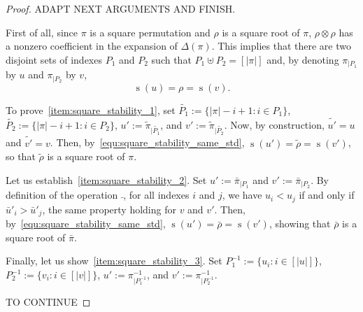 \documentclass[a4paper,10pt]{llncs}
\DeclareMathOperator{\STD}{\mathrm{s}}
\begin{document}
\begin{proof}
    ADAPT NEXT ARGUMENTS AND FINISH.

    First of all, since $\pi$ is a square permutation and $\rho$ is a
    square root of $\pi$, $\rho \otimes \rho$ has a nonzero coefficient
    in the expansion of $\Delta(\pi)$. This implies that there are two
    disjoint sets of indexes $P_1$ and $P_2$ such that
    $P_1 \uplus P_2 = [|\pi|]$ and, by denoting $\pi_{|P_1}$ by $u$ and
    $\pi_{|P_2}$ by $v$,
    \begin{equation} \label{equ:square_stability_same_std}
        \STD(u) = \rho = \STD(v).
    \end{equation}
    \smallskip

    To prove~\ref{item:square_stability_1}, set
    $\widetilde{P_1} := \{|\pi| - i  + 1 : i \in P_1\}$,
    $\widetilde{P_2} := \{|\pi| - i  + 1 : i \in P_2\}$,
    $u' := \widetilde{\pi}_{|\widetilde{P_1}}$, and
    $v' := \widetilde{\pi}_{|\widetilde{P_2}}$.
    Now, by construction, $\widetilde{u'} = u$ and $\widetilde{v'} = v$.
    Then, by~\eqref{equ:square_stability_same_std},
    $\STD(u') = \widetilde{\rho} = \STD(v')$, so that $\widetilde{\rho}$
    is a square root of $\pi$.
    \smallskip

    Let us establish~\ref{item:square_stability_2}. Set
    $u' := \bar \pi_{|P_1}$ and $v' := \bar \pi_{|P_2}$. By definition
    of the operation $\bar\,$, for all indexes $i$ and $j$, we have
    $u_i < u_j$ if and only if $\bar u'_i > \bar u'_j$, the same
    property holding for $v$ and $v'$. Then,
    by~\eqref{equ:square_stability_same_std},
    $\STD(u') = \bar \rho = \STD(v')$, showing that $\bar \rho$ is a
    square root of $\bar \pi$.
    \smallskip

    Finally, let us show~\ref{item:square_stability_3}. Set
    $P^{-1}_1 := \{u_i : i \in [|u|]\}$,
    $P^{-1}_2 := \{v_i : i \in [|v|]\}$, $u' := \pi^{-1}_{|P^{-1}_1}$,
    and $v' := \pi^{-1}_{|P^{-1}_2}$.

    TO CONTINUE
\end{proof}
\medskip
\end{document}
